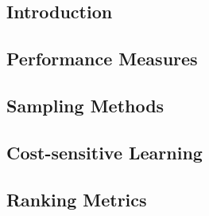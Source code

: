 

\subsection{Introduction}


\subsection{Performance Measures}


\subsection{Sampling Methods}


\subsection{Cost-sensitive Learning}


\subsection{Ranking Metrics}
